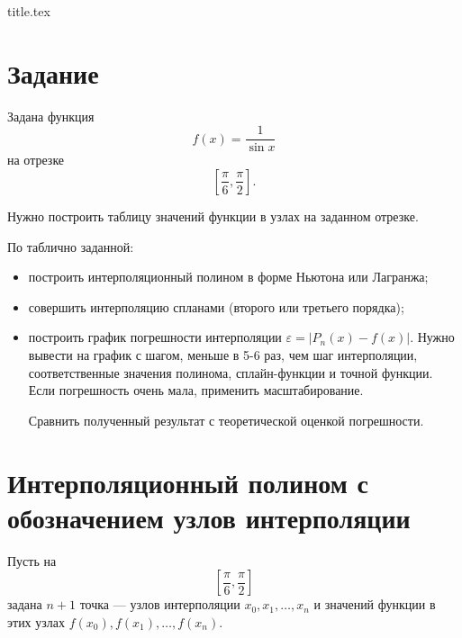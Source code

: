 




{title.tex}

\clearpage


\pagestyle{empty}
\thispagestyle{empty}
\tableofcontents

\clearpage
{}
\pagestyle{fancy}
\setcounter{page}{2}

\clearpage

\chapter{Задание}

Задана функция
$$ f \left( x \right) =
  \frac{1}{ \sin x}$$
на отрезке
$$ \left[ \frac{ \pi }{6}, \frac{ \pi }{2} \right].$$

Нужно построить таблицу значений функции в узлах на заданном отрезке.

По таблично заданной:
\begin{itemize}
  \item построить интерполяционный полином в форме Ньютона или Лагранжа;
  \item совершить интерполяцию спланами (второго или третьего порядка);
  \item построить график погрешности интерполяции
  $ \varepsilon = \left| P_n \left( x \right) - f \left( x \right) \right| $.
  Нужно вывести на график с шагом, меньше в 5-6 раз, чем шаг интерполяции,
  соответственные значения полинома, сплайн-функции и точной функции.
  Если погрешность очень мала, применить масштабирование.

  Сравнить полученный результат с теоретической оценкой погрешности.
\end{itemize}

\chapter{Интерполяционный полином с обозначением узлов интерполяции}

Пусть на
$$ \left[ \frac{ \pi }{6}, \frac{ \pi }{2} \right] $$
задана $n + 1$ точка ---
узлов интерполяции $x_0, x_1, \dotsc, x_n$ и значений функции в этих узлах
$f \left( x_0 \right), f \left( x_1 \right), \dotsc, f \left( x_n \right) $.

\lstset{inputencoding=utf8, extendedchars=\true}


